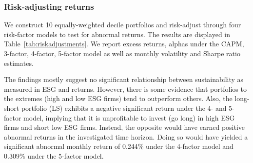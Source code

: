 \documentclass[11pt]{article}
\begin{document}
\subsubsection{Risk-adjusting returns}

We construct 10 equally-weighted decile portfolios and risk-adjust through four risk-factor models to test for abnormal returns. The results are displayed in Table~\ref{tab:riskadjustments}. We report excess returns, alphas under the CAPM, 3-factor, 4-factor, 5-factor model as well as monthly volatility and Sharpe ratio estimates.

The findings mostly suggest no significant relationship between sustainability as measured in ESG and returns. However, there is some evidence that portfolios to the extremes (high and low ESG firms) tend to outperform others. Also, the long-short portfolio (LS) exhibits a negative significant return under the 4- and 5-factor model, implying that it is unprofitable to invest (go long) in high ESG firms and short low ESG firms. Instead, the opposite would have earned positive abnormal returns in the investigated time horizon. Doing so would have yielded a significant abnormal monthly return of 0.244\% under the 4-factor model and 0.309\% under the 5-factor model. 
\end{document}
